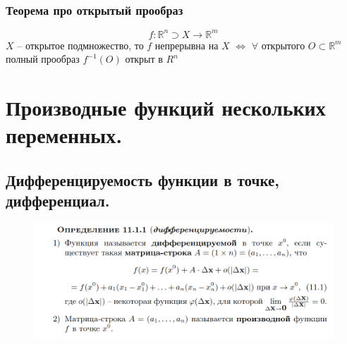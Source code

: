 \documentclass{article}
\newcommand{\R}{\mathbb{R}}
\begin{document}
\subsubsection{Теорема про открытый прообраз}
$$ f: \R^n \supset X \to \R^m $$
$X$ -- открытое подмножество, то $f$ непрерывна на $X$ $\Leftrightarrow$ $\forall$ открытого $O \subset \R^m$ полный прообраз $f^{-1}(O)$ открыт в $R^n$
\newpage

\section{Производные функций нескольких переменных.}
\subsection{Дифференцируемость функции в точке, дифференциал.}
\vspace{-0.5cm}
\begin{figure}[h!]
    \centering
    \includegraphics[width=\textwidth]{33.png}
    \vspace{-1.5cm}
\end{figure}
\end{document}
